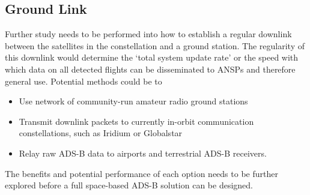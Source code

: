 \subsection{Ground Link}
Further study needs to be performed into how to establish a regular downlink between the satellites in the constellation and a ground station. The regularity of this downlink would determine the `total system update rate' or the speed with which data on all detected flights can be disseminated to ANSPs and therefore general use. Potential methods could be to
\begin{itemize}
	\item Use network of community-run amateur radio ground stations
	\item Transmit downlink packets to currently in-orbit communication constellations, such as Iridium or Globalstar
	\item Relay raw ADS-B data to airports and terrestrial ADS-B receivers.
\end{itemize}
The benefits and potential performance of each option needs to be further explored before a full space-based ADS-B solution can be designed.
